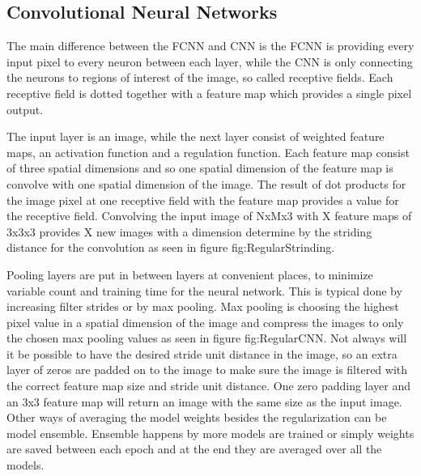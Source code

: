 \FloatBarrier

\subsection{Convolutional Neural Networks}

The main difference between the FCNN and CNN is the FCNN is providing every input pixel to every neuron between each layer, while the CNN is only connecting the neurons to regions of interest of the image, so called receptive fields. Each receptive field is dotted together with a feature map which provides a single pixel output.

The input layer is an image, while the next layer consist of weighted feature maps, an activation function and a regulation function. Each feature map consist of three spatial dimensions and so one spatial dimension of the feature map is convolve with one spatial dimension of the image. The result of dot products for the image pixel at one receptive field with the feature map provides a value for the receptive field. Convolving the input image of NxMx3 with X feature maps of 3x3x3 provides X new images with a dimension determine by the striding distance for the convolution as seen in figure fig:RegularStrinding.

\FloatBarrier

Pooling layers are put in between layers at convenient places, to minimize variable count and training time for the neural network. This is typical done by increasing filter strides or by max pooling. Max pooling is choosing the highest pixel value in a spatial dimension of the image and compress the images to only the chosen max pooling values as seen in figure fig:RegularCNN. Not always will it be possible to have the desired stride unit distance in the image, so an extra layer of zeros are padded on to the image to make sure the image is filtered with the correct feature map size and stride unit distance. One zero padding layer and an 3x3 feature map will return an image with the same size as the input image. Other ways of averaging the model weights besides the regularization can be model ensemble. Ensemble happens by more models are trained or simply weights are saved between each epoch and at the end they are averaged over all the models.   

\FloatBarrier